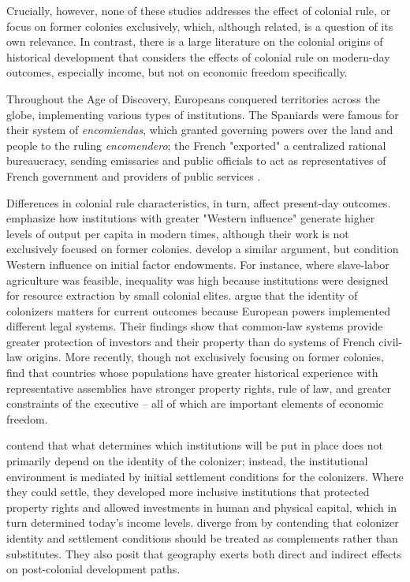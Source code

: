 \documentclass[a4paper,12pt]{article}
\begin{document}
Crucially, however, none of these studies addresses the effect of colonial rule, or focus on former colonies exclusively, which, although related, is a question of its own relevance. In contrast, there is a large literature on the colonial origins of historical development that considers the effects of colonial rule on modern-day outcomes, especially income, but not on economic freedom specifically. 

Throughout the Age of Discovery, Europeans conquered territories across the globe, implementing various types of institutions. The Spaniards were famous for their system of \textit{encomiendas}, which granted governing powers over the land and people to the ruling \textit{encomendero}; the French "exported" a centralized rational bureaucracy, sending emissaries and public officials to act as representatives of French government and providers of public services \citep{lockhart1983early,fieldhousecolonial, grier1999colonial}. 

Differences in colonial rule characteristics, in turn, affect present-day outcomes. \linebreak \cite{hall1999some} emphasize how institutions with greater "Western influence" generate higher levels of output per capita in modern times, although their work is not exclusively focused on former colonies. \cite{engermansokoloff1997} develop a similar argument, but condition Western influence on initial factor endowments. For instance, where slave-labor agriculture was feasible, inequality was high because institutions were designed for resource extraction by small colonial elites. \cite{laporta1997legal,laporta1998law,laporta2008economic} argue that the identity of colonizers matters for current outcomes because European powers implemented different legal systems. Their findings show that common-law systems provide greater protection of investors and their property than do systems of French civil-law origins. More recently, though not exclusively focusing on former colonies, \cite{pavlik2021legacy} find that countries whose populations have greater historical experience with representative assemblies have stronger property rights, rule of law, and greater constraints of the executive -- all of which are important elements of economic freedom.

\cite{Acemoglu2001} contend that what determines which institutions will be put in place does not primarily depend on the identity of the colonizer; instead, the institutional environment is mediated by initial settlement conditions for the colonizers. Where they could settle, they developed more inclusive institutions that protected property rights and allowed investments in human and physical capital, which in turn determined today's income levels. \cite{bennett2017economic} diverge from \cite{Acemoglu2001} by contending that colonizer identity and settlement conditions should be treated as complements rather than substitutes. They also posit that geography exerts both direct and indirect effects on post-colonial development paths. 
\end{document}
